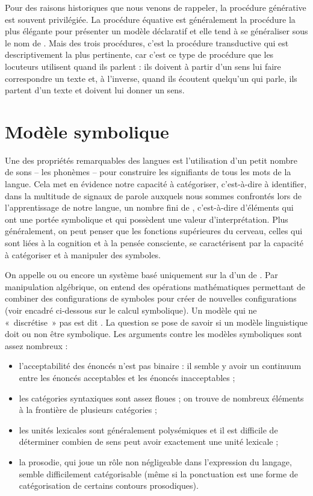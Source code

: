 {    Pour des raisons historiques que nous venons de rappeler, la procédure générative est souvent privilégiée. La procédure équative est généralement la procédure la plus élégante pour présenter un modèle déclaratif et elle tend à se généraliser sous le nom de . Mais des trois procédures, c’est la procédure transductive qui est descriptivement la plus pertinente, car c’est ce type de procédure que les locuteurs utilisent quand ils parlent : ils doivent à partir d’un sens lui faire correspondre un texte et, à l’inverse, quand ils écoutent quelqu’un qui parle, ils partent d’un texte et doivent lui donner un sens.
}
\section{Modèle symbolique}\label{sec:1.3.6}%

Une des propriétés remarquables des langues est l’utilisation d’un petit nombre de sons – les phonèmes – pour construire les signifiants de tous les mots de la langue. Cela met en évidence notre capacité à catégoriser, c’est-à-dire à identifier, dans la multitude de signaux de parole auxquels nous sommes confrontés lors de l’apprentissage de notre langue, un nombre fini de , c’est-à-dire d’éléments qui ont une portée symbolique et qui possèdent une valeur d’interprétation. Plus généralement, on peut penser que les fonctions supérieures du cerveau, celles qui sont liées à la cognition et à la pensée consciente, se caractérisent par la capacité à catégoriser et à manipuler des symboles.

On appelle  ou  ou encore  un système basé uniquement sur la  d’un  de . Par manipulation algébrique, on entend des opérations mathématiques permettant de combiner des configurations de symboles pour créer de nouvelles configurations (voir encadré ci-dessous sur le calcul symbolique). Un modèle qui ne «~discrétise~» pas est dit . La question se pose de savoir si un modèle linguistique doit ou non être symbolique. Les arguments contre les modèles symboliques sont assez nombreux :

\begin{itemize}
\item l’acceptabilité des énoncés n’est pas binaire : il semble y avoir un continuum entre les énoncés acceptables et les énoncés inacceptables ;
\item les catégories syntaxiques sont assez floues ; on trouve de nombreux éléments à la frontière de plusieurs catégories ;
\item les unités lexicales sont généralement polysémiques et il est difficile de déterminer combien de sens peut avoir exactement une unité lexicale ;
\item la prosodie, qui joue un rôle non négligeable dans l’expression du langage, semble difficilement catégorisable (même si la ponctuation est une forme de catégorisation de certains contours prosodiques).
\end{itemize}

